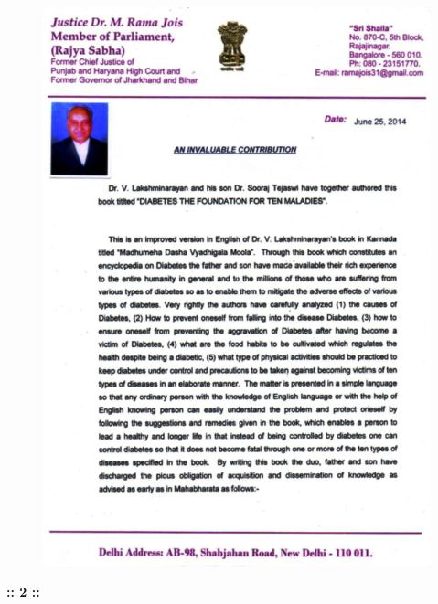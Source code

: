 \thispagestyle{empty}


\begin{figure}[h]
\centering
\includegraphics[scale=2]{images/002.jpg}
\end{figure}

\newpage

\begin{center}
\textbf{:: 2 ::}
\end{center}



